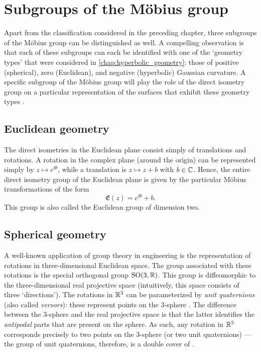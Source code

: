\section{Subgroups of the Möbius group}
\label{sec:subgroups}
Apart from the classification considered in the preceding chapter, three subgroups of the Möbius group can be distinguished as well. A compelling observation is that each of these subgroups can each be identified with one of the `geometry types' that were considered in \cref{chap:hyperbolic_geometry}: those of positive (spherical), zero (Euclidean), and negative (hyperbolic) Gaussian curvature. A specific subgroup of the Möbius group will play the role of the direct isometry group on a particular representation of the surfaces that exhibit these geometry types \cite{Needham2021}.

\subsection{Euclidean geometry}
The direct isometries in the Euclidean plane consist simply of translations and rotations. A rotation in the complex plane (around the origin) can be represented simply by \(z \mapsto e^{\ii \theta}\), while a translation is \(z \mapsto z + b\) with \(b \in \mathbb{C}\). Hence, the entire direct isometry group of the Euclidean plane is given by the particular Möbius transformations of the form
    \[ \mathfrak{E}(z) = e^{\ii\theta} + b. \]
This group is also called the Euclidean group of dimension two.

\subsection{Spherical geometry}
A well-known application of group theory in engineering is the representation of rotations in three-dimensional Euclidean space. The group associated with these rotations is the special orthogonal group \(\mathrm{SO}(3, \mathbb{R})\). This group is diffeomorphic to the three-dimensional real projective space  (intuitively, this space consists of three `directions'). The rotations in \(\mathbb{R}^3\) can be parameterized by \emph{unit quaternions} (also called \emph{versors}): these represent points on the 3-sphere . The difference between the 3-sphere and the real projective space is that the latter identifies the \emph{antipodal} parts that are present on the sphere. As such, any rotation in \(\mathbb{R}^3\) corresponds precisely to two points on the 3-sphere (or two unit quaternions) --- the group of unit quaternions, therefore, is a double cover of \sogroup. 

